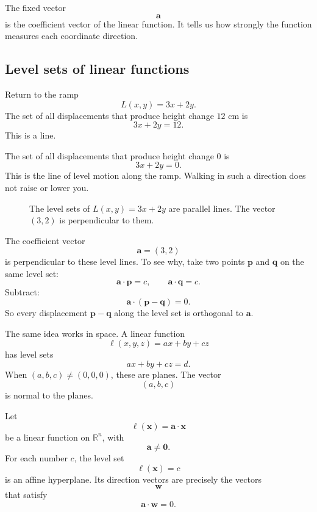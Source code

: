 The fixed vector
\[
    \mathbf a
\]
is the coefficient vector of the linear function.  It tells us how strongly the function
measures each coordinate direction.

\subsection{Level sets of linear functions}

Return to the ramp
\[
    L(x,y)=3x+2y.
\]
The set of all displacements that produce height change \(12\) cm is
\[
    3x+2y=12.
\]
This is a line.

The set of all displacements that produce height change \(0\) is
\[
    3x+2y=0.
\]
This is the line of level motion along the ramp.  Walking in such a direction does not
raise or lower you.

\begin{figure}[H]
\centering
{}
\caption{The level sets of \(L(x,y)=3x+2y\) are parallel lines.  The vector \((3,2)\)
is perpendicular to them.}
\end{figure}

The coefficient vector
\[
    \mathbf a=(3,2)
\]
is perpendicular to these level lines.  To see why, take two points \(\mathbf p\) and
\(\mathbf q\) on the same level set:
\[
    \mathbf a\cdot\mathbf p=c,
    \qquad
    \mathbf a\cdot\mathbf q=c.
\]
Subtract:
\[
    \mathbf a\cdot(\mathbf p-\mathbf q)=0.
\]
So every displacement \(\mathbf p-\mathbf q\) along the level set is orthogonal to
\(\mathbf a\).

The same idea works in space.  A linear function
\[
    \ell(x,y,z)=ax+by+cz
\]
has level sets
\[
    ax+by+cz=d.
\]
When \((a,b,c)\neq(0,0,0)\), these are planes.  The vector
\[
    (a,b,c)
\]
is normal to the planes.

\begin{theorem}
Let
\[
    \ell(\mathbf x)=\mathbf a\cdot\mathbf x
\]
be a linear function on \(\mathbb R^n\), with
\[
    \mathbf a\neq\mathbf 0.
\]
For each number \(c\), the level set
\[
    \ell(\mathbf x)=c
\]
is an affine hyperplane.  Its direction vectors are precisely the vectors
\[
    \mathbf w
\]
that satisfy
\[
    \mathbf a\cdot\mathbf w=0.
\]
\end{theorem}

